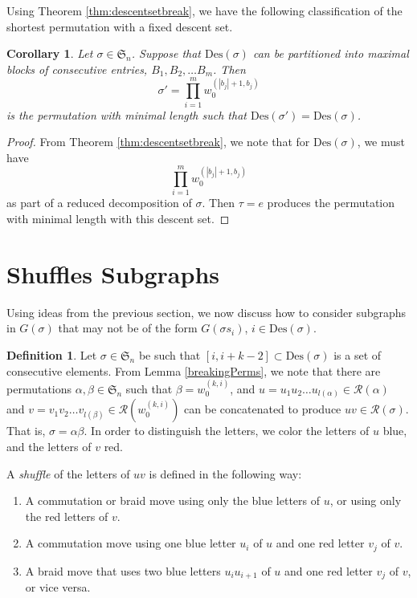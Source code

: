 \documentclass[11pt,reqno]{amsart}
\newtheorem{corollary}[theorem]{Corollary}
\theoremstyle{definition}
\newtheorem{definition}[theorem]{Definition}
\theoremstyle{notation}
\newcommand{\Des}{\text{Des}}
\newcommand{\calR}{\mathcal{R}}
\newcommand{\JEem}{\textit}
\begin{document}
Using Theorem \ref{thm:descentsetbreak}, we have the following classification of the shortest permutation with a fixed descent set.

\begin{corollary}\label{cor:minimalperm}
    Let $\sigma\in \mathfrak{S}_n$. Suppose that $\Des(\sigma)$ can be partitioned into maximal blocks of consecutive entries, $B_1, B_2,\ldots B_m$. Then
    \[
    \sigma' = \prod_{i=1}^m w_0^{(|b_j|+1,b_j)}
    \]
    is the permutation with minimal length such that $\Des(\sigma') = \Des(\sigma)$.
\end{corollary}

\begin{proof}
    From Theorem \ref{thm:descentsetbreak}, we note that for $\Des(\sigma)$, we must have 
    \[
    \prod_{i=1}^m w_0^{(|b_j|+1,b_j)}
    \]
    as part of a reduced decomposition of $\sigma$. Then $\tau = e$ produces the permutation with minimal length with this descent set.
\end{proof}


\section{Shuffles Subgraphs}\label{subsec:shuffles}

Using ideas from the previous section, we now discuss how to consider subgraphs in $G(\sigma )$ that may not be of the form $G(\sigma s_i)$, $i\in \Des(\sigma )$.


\begin{definition}\label{shuffledef}
Let $\sigma \in \mathfrak{S}_n$ be such that $[i,i+k-2]\subset \Des(\sigma)$ is a set of consecutive elements. From Lemma \ref{breakingPerms}, we note that there are permutations $\alpha, \beta \in \mathfrak{S}_n$ such that $\beta =w_0^{(k,i)}$, and $u=u_1u_2\ldots u_{l(\alpha)}\in \calR(\alpha)$ and $v=v_1v_2\ldots v_{l(\beta)}\in \calR(w_0^{(k,i)})$ can be concatenated to produce $uv\in \calR(\sigma)$. That is, $\sigma = \alpha \beta$. In order to distinguish the letters, we color the letters of $u$ blue, and the letters of $v$ red.

A \JEem{shuffle} of the letters of $uv$ is defined in the following way:
\begin{enumerate}
    \item A commutation or braid move using only the blue letters of $u$, or using only the red letters of $v$.
    \item A commutation move using one blue letter $u_i$ of $u$ and one red letter $v_j$ of $v$.
    \item A braid move that uses two blue letters $u_i u_{i+1}$ of $u$ and one red letter $v_j$ of $v$, or vice versa.
\end{enumerate}
\end{definition}
\end{document}
